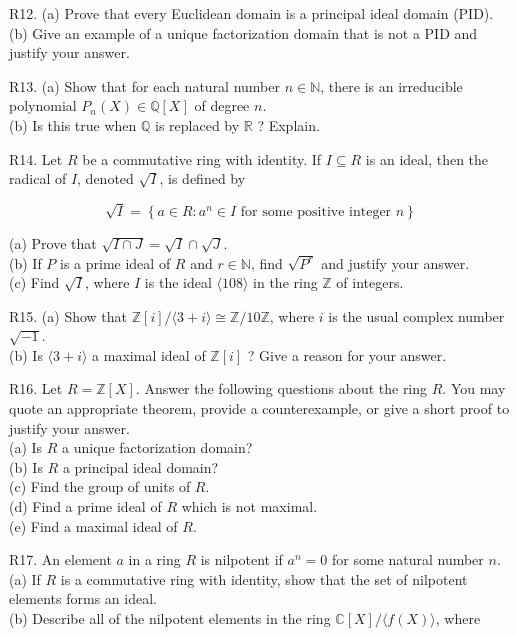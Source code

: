 R12. (a) Prove that every Euclidean domain is a principal ideal domain (PID).\\
(b) Give an example of a unique factorization domain that is not a PID and justify your answer.

R13. (a) Show that for each natural number $n \in \mathbb{N}$, there is an irreducible polynomial $P_{n}(X) \in \mathbb{Q}[X]$ of degree $n$.\\
(b) Is this true when $\mathbb{Q}$ is replaced by $\mathbb{R}$ ? Explain.

R14. Let $R$ be a commutative ring with identity. If $I \subseteq R$ is an ideal, then the radical of $I$, denoted $\sqrt{I}$, is defined by

$$
\sqrt{I}=\left\{a \in R: a^{n} \in I \text { for some positive integer } n\right\}
$$

(a) Prove that $\sqrt{I \cap J}=\sqrt{I} \cap \sqrt{J}$.\\
(b) If $P$ is a prime ideal of $R$ and $r \in \mathbb{N}$, find $\sqrt{P^{r}}$ and justify your answer.\\
(c) Find $\sqrt{I}$, where $I$ is the ideal $\langle 108\rangle$ in the ring $\mathbb{Z}$ of integers.

R15. (a) Show that $\mathbb{Z}[i] /\langle 3+i\rangle \cong \mathbb{Z} / 10 \mathbb{Z}$, where $i$ is the usual complex number $\sqrt{-1}$.\\
(b) Is $\langle 3+i\rangle$ a maximal ideal of $\mathbb{Z}[i]$ ? Give a reason for your answer.

R16. Let $R=\mathbb{Z}[X]$. Answer the following questions about the ring $R$. You may quote an appropriate theorem, provide a counterexample, or give a short proof to justify your answer.\\
(a) Is $R$ a unique factorization domain?\\
(b) Is $R$ a principal ideal domain?\\
(c) Find the group of units of $R$.\\
(d) Find a prime ideal of $R$ which is not maximal.\\
(e) Find a maximal ideal of $R$.

R17. An element $a$ in a ring $R$ is nilpotent if $a^{n}=0$ for some natural number $n$.\\
(a) If $R$ is a commutative ring with identity, show that the set of nilpotent elements forms an ideal.\\
(b) Describe all of the nilpotent elements in the ring $\mathbb{C}[X] /\langle f(X)\rangle$, where

